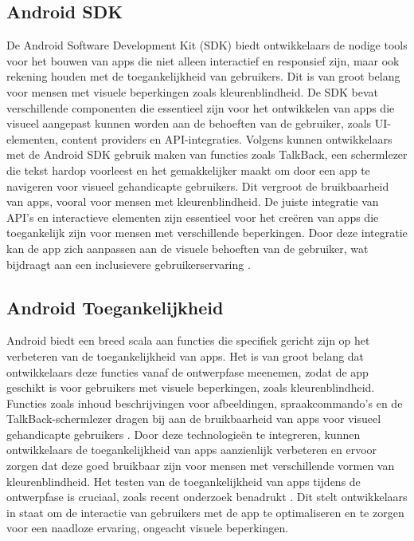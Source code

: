 \subsection{Android SDK}
De Android Software Development Kit (SDK) biedt ontwikkelaars de nodige tools voor het bouwen 
van apps die niet alleen interactief en responsief zijn, maar ook rekening houden met 
de toegankelijkheid van gebruikers. Dit is van groot belang voor mensen met visuele beperkingen 
zoals kleurenblindheid. De SDK bevat verschillende componenten die essentieel zijn voor het 
ontwikkelen van apps die visueel aangepast kunnen worden aan de behoeften van de gebruiker, 
zoals UI-elementen, content providers en API-integraties. Volgens \textcite{Geeks2024} kunnen ontwikkelaars 
met de Android SDK gebruik maken van functies zoals TalkBack, een schermlezer die tekst hardop 
voorleest en het gemakkelijker maakt om door een app te navigeren voor visueel gehandicapte gebruikers. 
Dit vergroot de bruikbaarheid van apps, vooral voor mensen met kleurenblindheid. De juiste integratie 
van API's en interactieve elementen zijn essentieel voor het creëren van apps die toegankelijk zijn 
voor mensen met verschillende beperkingen. Door deze integratie kan de app zich aanpassen aan de 
visuele behoeften van de gebruiker, wat bijdraagt aan een inclusievere gebruikerservaring \autocite{Lee2011}.
\subsection{Android Toegankelijkheid}
Android biedt een breed scala aan functies die specifiek gericht zijn op het verbeteren van 
de toegankelijkheid van apps. Het is van groot belang dat ontwikkelaars deze functies vanaf de 
ontwerpfase meenemen, zodat de app geschikt is voor gebruikers met visuele beperkingen, zoals 
kleurenblindheid. Functies zoals inhoud beschrijvingen voor afbeeldingen, spraakcommando’s en de 
TalkBack-schermlezer dragen bij aan de bruikbaarheid van apps voor visueel gehandicapte 
gebruikers \autocite{Swearngin2024}. Door deze technologieën te integreren, kunnen ontwikkelaars de 
toegankelijkheid van apps aanzienlijk verbeteren en ervoor zorgen dat deze goed bruikbaar zijn voor 
mensen met verschillende vormen van kleurenblindheid. Het testen van de toegankelijkheid van apps 
tijdens de ontwerpfase is cruciaal, zoals recent onderzoek benadrukt \textcite{Gregorio2022}. Dit stelt 
ontwikkelaars in staat om de interactie van gebruikers met de app te optimaliseren en te zorgen voor 
een naadloze ervaring, ongeacht visuele beperkingen.
